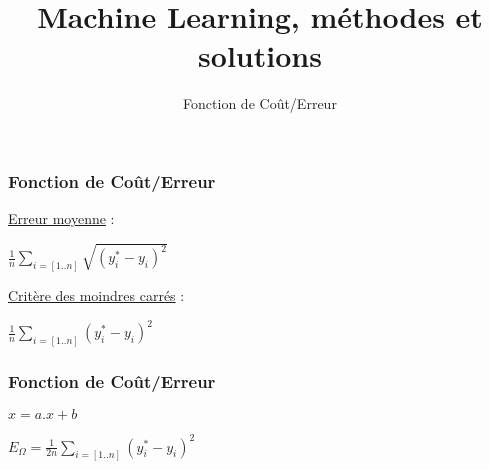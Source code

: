 \documentclass{formation}
\title{Machine Learning, méthodes et solutions}
\subtitle{Fonction de Coût/Erreur}
\begin{document}
\maketitle

\begin{frame}
  \frametitle{Fonction de Coût/Erreur}
  \begin{minipage}[l]{0.40\linewidth}
  \underline{Erreur moyenne} :
  \begin{center}
    $\frac{1}{n}\sum_{i=[1..n]}\sqrt{( y_i^* - y_i )^2}$
    \newline
  \end{center}
  \underline{Critère des moindres carrés} :
  \begin{center}
    $\frac{1}{n}\sum_{i=[1..n]}( y_i^* - y_i )^2$
  \end{center}
  \end{minipage}\hfill
  \begin{minipage}[l]{0.59\linewidth}
  \end{minipage}\hfill
\end{frame}

\begin{frame}
  \frametitle{Fonction de Coût/Erreur}
  \begin{minipage}[l]{0.49\linewidth}
  \begin{center}
    $x = a.x+b$
  \end{center}
  \end{minipage}\hfill
  \begin{minipage}[l]{0.49\linewidth}
  $\boxed{E_\Omega = \frac{1}{2n}\sum_{i=[1..n]}( y_i^* - y_i )^2}$ \\
  \end{minipage}\hfill
\end{frame}
\end{document}
